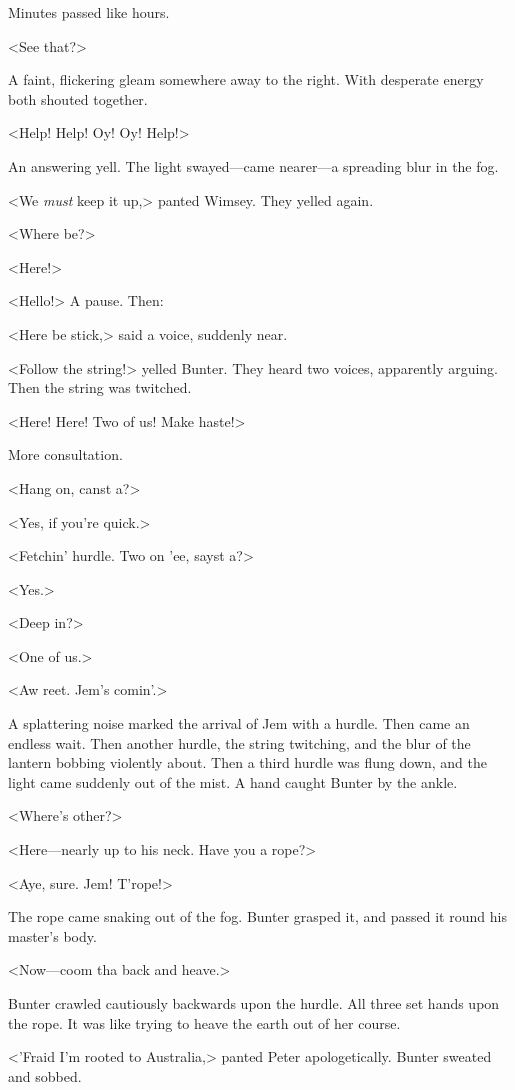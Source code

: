 \divider

Minutes passed like hours. 

\divider

<See that?>

A faint, flickering gleam somewhere away to the right. With desperate energy both shouted together.

<Help! Help! Oy! Oy! Help!>

An answering yell. The light swayed—came nearer—a spreading blur in the fog.

<We \emph{must} keep it up,> panted Wimsey. They yelled again.

<Where be?>

<Here!>

<Hello!> A pause. Then:

<Here be stick,> said a voice, suddenly near.

<Follow the string!> yelled Bunter. They heard two voices, apparently arguing. Then the string was twitched.

<Here! Here! Two of us! Make haste!>

More consultation.

<Hang on, canst a?>

<Yes, if you're quick.>

<Fetchin' hurdle. Two on 'ee, sayst a?>

<Yes.>

<Deep in?>

<One of us.>

<Aw reet. Jem's comin'.>

A splattering noise marked the arrival of Jem with a hurdle. Then came an endless wait. Then another hurdle, the string twitching, and the blur of the lantern bobbing violently about. Then a third hurdle was flung down, and the light came suddenly out of the mist. A hand caught Bunter by the ankle.

<Where's other?>

<Here—nearly up to his neck. Have you a rope?>

<Aye, sure. Jem! T'rope!>

The rope came snaking out of the fog. Bunter grasped it, and passed it round his master's body.

<Now—coom tha back and heave.>

Bunter crawled cautiously backwards upon the hurdle. All three set hands upon the rope. It was like trying to heave the earth out of her course.

<'Fraid I'm rooted to Australia,> panted Peter apologetically. Bunter sweated and sobbed.


